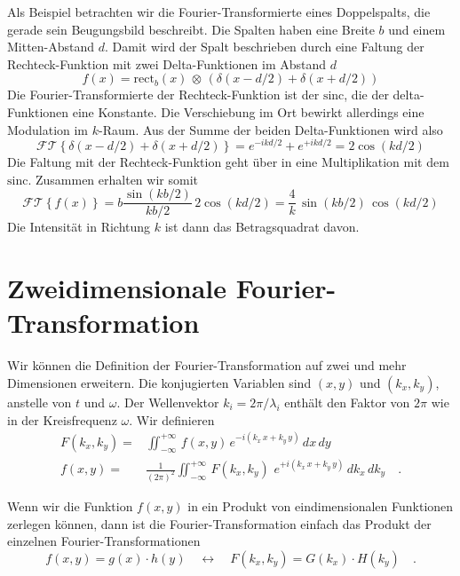 Als Beispiel betrachten wir die Fourier-Transformierte eines Doppelspalts, die gerade sein Beugungsbild beschreibt. Die Spalten haben eine Breite $b$ und einem Mitten-Abstand $d$. Damit wird der Spalt beschrieben durch eine Faltung der Rechteck-Funktion mit zwei Delta-Funktionen im Abstand $d$
\begin{equation}
f(x) = \text{rect} _b (x) \, \otimes \, \left( \delta (x - d/2) + \delta (x + d/2) \right)
\end{equation}
Die Fourier-Transformierte der Rechteck-Funktion ist der $\text{sinc}$, die der delta-Funktionen eine Konstante. Die Verschiebung im Ort bewirkt allerdings eine Modulation im $k$-Raum. Aus der Summe der beiden Delta-Funktionen wird also 
\begin{equation}
\mathcal{FT}\left\{ \delta (x - d/2) + \delta (x + d/2)  \right\} =
e^{-i k d/2} + e^{+i k d/2}  = 2 \cos ( k d/2)
\end{equation}
Die Faltung mit der Rechteck-Funktion geht über in eine Multiplikation mit dem $\text{sinc}$. Zusammen erhalten wir somit
\begin{equation}
\mathcal{FT}\left\{ f(x)  \right\} = b \frac{\sin (k b/2) }{kb/2} \, 2 \cos ( k d/2) = \frac{4}{k} \, \sin (k b/2) \,  \cos ( k d/2) 
\end{equation}
Die Intensität in Richtung $k$ ist dann das Betragsquadrat davon.




\section{Zweidimensionale Fourier-Transformation}

Wir können die Definition der Fourier-Transformation auf zwei und mehr Dimensionen erweitern. Die konjugierten Variablen sind $(x,y)$ und $(k_x, k_y)$, anstelle von $t$ und $\omega$. Der Wellenvektor $k_i = 2\pi / \lambda_i$ enthält den Faktor von $2\pi$ wie in der Kreisfrequenz $\omega$. Wir definieren
\begin{align}
  F(k_x, k_y) = & \iint_{-\infty}^{+\infty} \, f(x,y) \, e^{- i (k_x \, x + k_y \, y )} \, dx \, dy \\
  f(x,y) = & \frac{1}{(2 \pi )^2} \iint_{-\infty}^{+\infty} \, F(k_x, k_y) \,\, e^{+ i (k_x \, x + k_y \, y )}  \, dk_x \,dk_y \quad .
 \end{align}


 Wenn wir die Funktion $f(x,y)$ in ein Produkt von eindimensionalen Funktionen zerlegen können, dann ist die Fourier-Transformation einfach das Produkt der einzelnen Fourier-Transformationen
\begin{equation}
  f(x,y) = g(x) \cdot h(y) \quad \leftrightarrow \quad 
  F(k_x, k_y) = G(k_x) \cdot H(k_y) \quad .
\end{equation}


